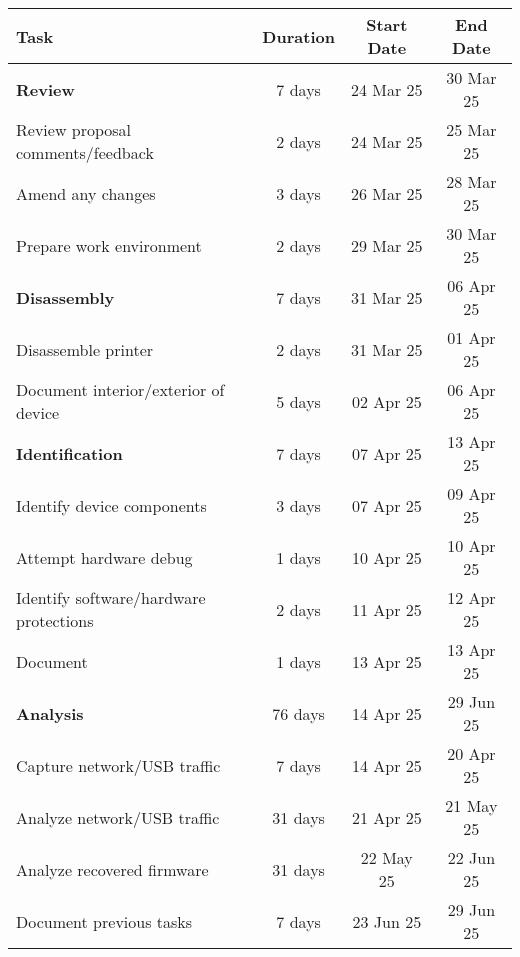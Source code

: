 \begin{table}[h]
  \centering
  \begin{tabular}{ |l||c|c|c| }
    \hline\rowcolor{gray!30}

    \textbf{Task} & \textbf{Duration} & \textbf{Start Date} & \textbf{End Date} \\
  
    \hline


    \hline\rowcolor{gray!10} 

    \textbf{Review} & 7 days & 24 Mar 25 & 30 Mar 25 \\

    Review proposal comments/feedback & 2 days & 24 Mar 25 & 25 Mar 25 \\
    Amend any changes & 3 days & 26 Mar 25 & 28 Mar 25 \\
    Prepare work environment & 2 days & 29 Mar 25 & 30 Mar 25 \\

    \hline
    \hline\rowcolor{gray!10} 

    \textbf{Disassembly} & 7 days & 31 Mar 25 & 06 Apr 25 \\

    Disassemble printer & 2 days & 31 Mar 25 & 01 Apr 25 \\
    Document interior/exterior of device & 5 days & 02 Apr 25 & 06 Apr 25 \\

    \hline
    \hline\rowcolor{gray!10}

    \textbf{Identification} & 7 days & 07 Apr 25 & 13 Apr 25 \\

    Identify device components & 3 days & 07 Apr 25 & 09 Apr 25 \\
    Attempt hardware debug & 1 days & 10 Apr 25 & 10 Apr 25 \\
    Identify software/hardware protections & 2 days & 11 Apr 25 & 12 Apr 25 \\
    Document & 1 days & 13 Apr 25 & 13 Apr 25 \\

    \hline
    \hline\rowcolor{gray!10}

    \textbf{Analysis} &  76 days & 14 Apr 25 & 29 Jun 25 \\

    Capture network/USB traffic & 7 days & 14 Apr 25 & 20 Apr 25 \\
    Analyze network/USB traffic & 31 days & 21 Apr 25 & 21 May 25 \\
    Analyze recovered firmware & 31 days & 22 May 25 & 22 Jun 25 \\
    Document previous tasks & 7 days & 23 Jun 25 & 29 Jun 25 \\


\end{tabular}
\end{table}
